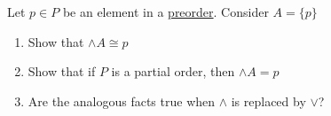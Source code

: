 Let $p \in P$ be an element in a \href{doc/1 math/Seven Sketches in Compositionality/Chapter 1: Generative Effects/3 Preorders/1 Preorder}{preorder}. Consider $A = \{p\}$

    \begin{enumerate}
      \item Show that $\wedge A \cong p$
      \item Show that if $P$ is a partial order, then $\wedge A = p$
      \item Are the analogous facts true when $\wedge$ is replaced by $\vee$?
    \end{enumerate}